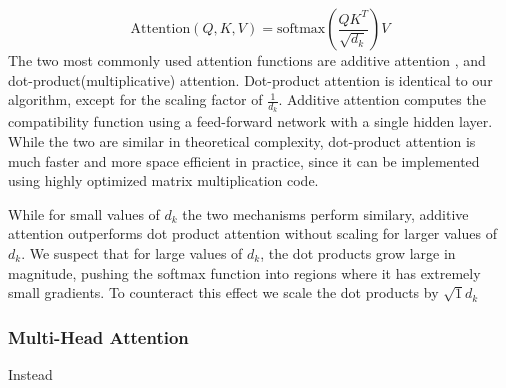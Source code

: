 \documentclass{article}
\begin{document}
\begin{equation}
\mathrm{Attention}\left(Q,K,V\right)=\mathrm{softmax}\left(\frac{QK^T}{\sqrt{d_k}}\right)V
\end{equation}
The two most commonly used attention functions are additive attention \cite{2}, and dot-product(multiplicative) attention.
Dot-product attention is identical to our algorithm, except for the scaling factor of $\frac{1}{d_k}$.
Additive attention computes the compatibility function using a feed-forward network with a single hidden layer.
While the two are similar in theoretical complexity, dot-product attention is much faster and more space efficient in practice, since it can be implemented using highly optimized matrix multiplication code.

While for small values of $d_k$ the two mechanisms perform similary, additive attention outperforms dot product attention without scaling for larger values of $d_k$\cite{3}. 
We suspect that for large values of $d_k$, the dot products grow large in magnitude, pushing the softmax function into regions where it has extremely small gradients. To counteract this effect we scale the dot products by $\sqrt{1}{d_k}$

\subsubsection{Multi-Head Attention}

Instead 



\end{document}
